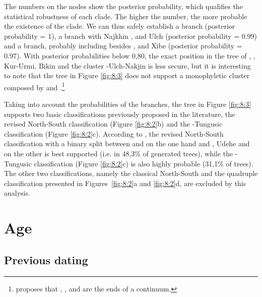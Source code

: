 \documentclass[output=paper,colorlinks,citecolor=brown]{langscibook}
\begin{document}
The numbers on the nodes show the posterior probability, which qualifies the statistical robustness of each clade. The higher the number, the more probable the existence of the clade. We can thus safely establish a  branch (posterior probability = 1), a  branch with Najkhin ,  and Ulch (posterior probability = 0.99) and a  branch, probably including  besides ,  and Xibe (posterior probability = 0.97). With posterior probabilities below 0,80, the exact position in the tree of , , Kur-Urmi, Bikin  and the cluster -Ulch-Nakjin   is less secure, but it is interesting to note that the tree in Figure \ref{fig:8:3} does not support a monophyletic cluster composed by  and .\footnote{ proposes that , , and  are the ends of a continuum.}

Taking into account the probabilities of the branches, the tree in Figure \ref{fig:8:3} supports two basic classifications previously proposed in the literature, the revised North-South classification (Figure \ref{fig:8:2}b) and the -Tungusic classification (Figure \ref{fig:8:2}c). According to \citet{Oskolskayaetal2022}, the revised North-South classification with a binary split between  and  on the one hand and , Udehe and  on the other is best supported (i.e. in 48,3\% of generated trees), while the -Tungusic classification (Figure \ref{fig:8:2}c) is also highly probable (31,1\% of trees). The other two classifications, namely the classical North-South and the quadruple classification presented in Figures~\ref{fig:8:2}a and \ref{fig:8:2}d, are excluded by this analysis.


\section{Age}\label{Section8.3}

\subsection{Previous dating}\label{Section8.3.1}
\end{document}
